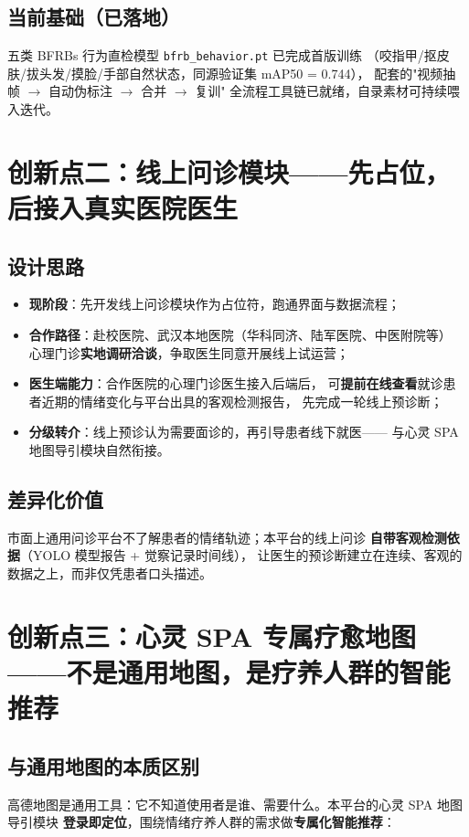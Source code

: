 \documentclass[12pt, a4paper]{ctexart}
\begin{document}
\subsection{当前基础（已落地）}
五类 BFRBs 行为直检模型 \texttt{bfrb\_behavior.pt} 已完成首版训练
（咬指甲/抠皮肤/拔头发/摸脸/手部自然状态，同源验证集 mAP50 = 0.744），
配套的"视频抽帧 $\rightarrow$ 自动伪标注 $\rightarrow$ 合并 $\rightarrow$ 复训"
全流程工具链已就绪，自录素材可持续喂入迭代。

\section{创新点二：线上问诊模块——先占位，后接入真实医院医生}

\subsection{设计思路}
\begin{itemize}
  \item \textbf{现阶段}：先开发线上问诊模块作为占位符，跑通界面与数据流程；
  \item \textbf{合作路径}：赴校医院、武汉本地医院（华科同济、陆军医院、中医附院等）
        心理门诊\textbf{实地调研洽谈}，争取医生同意开展线上试运营；
  \item \textbf{医生端能力}：合作医院的心理门诊医生接入后端后，
        可\textbf{提前在线查看}就诊患者近期的情绪变化与平台出具的客观检测报告，
        先完成一轮线上预诊断；
  \item \textbf{分级转介}：线上预诊认为需要面诊的，再引导患者线下就医——
        与心灵 SPA 地图导引模块自然衔接。
\end{itemize}

\subsection{差异化价值}
市面上通用问诊平台不了解患者的情绪轨迹；本平台的线上问诊
\textbf{自带客观检测依据}（YOLO 模型报告 + 觉察记录时间线），
让医生的预诊断建立在连续、客观的数据之上，而非仅凭患者口头描述。

\section{创新点三：心灵 SPA 专属疗愈地图——不是通用地图，是疗养人群的智能推荐}

\subsection{与通用地图的本质区别}
高德地图是通用工具：它不知道使用者是谁、需要什么。本平台的心灵 SPA 地图导引模块
\textbf{登录即定位}，围绕情绪疗养人群的需求做\textbf{专属化智能推荐}：
\end{document}
